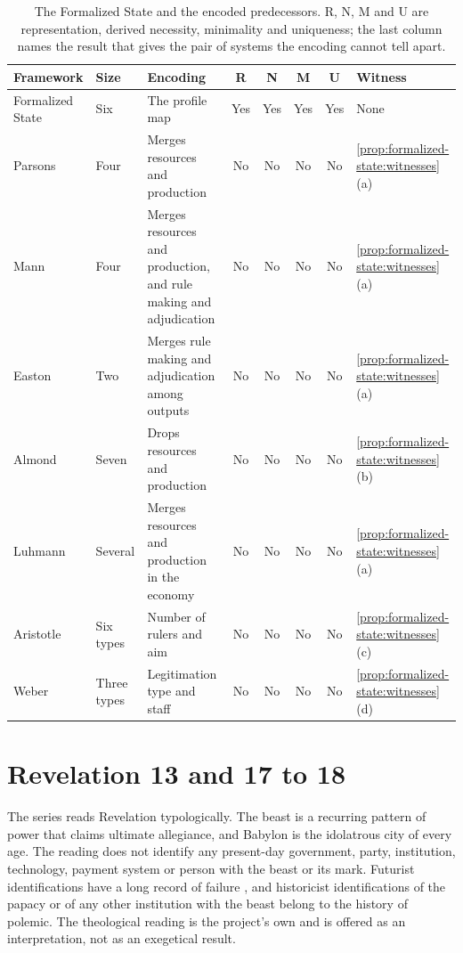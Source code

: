 \documentclass[11pt,letterpaper]{article}
\theoremstyle{definition}
\theoremstyle{remark}
\begin{document}
\begin{table}[!htbp]
\centering
\small
\caption{The Formalized State and the encoded predecessors. R, N, M and U are representation, derived necessity, minimality and uniqueness; the last column names the result that gives the pair of systems the encoding cannot tell apart.}
\label{tab:predecessors}
\footnotesize
\setlength{\tabcolsep}{3.5pt}
\begin{tabularx}{\textwidth}{@{}L{1.8cm}L{1.2cm}Ycccc L{2.7cm}@{}}
\toprule
Framework & Size & Encoding & R & N & M & U & Witness \\
\midrule
Formalized State & Six & The profile map & Yes & Yes & Yes & Yes & None \\
Parsons & Four & Merges resources and production & No & No & No & No & \cref{prop:formalized-state:witnesses}(a) \\
Mann & Four & Merges resources and production, and rule making and adjudication & No & No & No & No & \cref{prop:formalized-state:witnesses}(a) \\
Easton & Two & Merges rule making and adjudication among outputs & No & No & No & No & \cref{prop:formalized-state:witnesses}(a) \\
Almond & Seven & Drops resources and production & No & No & No & No & \cref{prop:formalized-state:witnesses}(b) \\
Luhmann & Several & Merges resources and production in the economy & No & No & No & No & \cref{prop:formalized-state:witnesses}(a) \\
Aristotle & Six types & Number of rulers and aim & No & No & No & No & \cref{prop:formalized-state:witnesses}(c) \\
Weber & Three types & Legitimation type and staff & No & No & No & No & \cref{prop:formalized-state:witnesses}(d) \\
\bottomrule
\end{tabularx}
\end{table}

\section{Revelation 13 and 17 to 18}
\label{sec:revelation}

The series reads Revelation typologically. The beast is a recurring pattern of power that claims ultimate allegiance, and Babylon is the idolatrous city of every age. The reading does not identify any present-day government, party, institution, technology, payment system or person with the beast or its mark. Futurist identifications have a long record of failure \citep{mcginn1998,fuller1995,boyer1992}, and historicist identifications of the papacy or of any other institution with the beast belong to the history of polemic. The theological reading is the project's own and is offered as an interpretation, not as an exegetical result.
\end{document}

